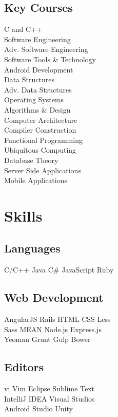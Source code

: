 \documentclass[]{deedy-resume-openfont}
\begin{document}
\begin{minipage}[t]{0.33\textwidth}
\subsection{Key Courses}
C and C++ \\
Software Engineering \\
Adv. Software Engineering \\
Software Tools \& Technology \\
Android Development \\
Data Structures \\
Adv. Data Structures \\
Operating Systems \\
Algorithms \& Design \\
Computer Architecture \\
Compiler Construction \\
Functional Programming \\
Ubiquitous Computing \\
Database Theory \\
Server Side Applications \\
Mobile Applications
\sectionsep


\section{Skills}
\subsection{Languages}
C/C++ \textbullet{} Java \textbullet{} C\# \textbullet{} JavaScript \textbullet{} Ruby \\ 
\subsection{Web Development}
AngularJS \textbullet{} Rails \textbullet{} HTML \textbullet{} CSS \textbullet{} Less \\
Sass \textbullet{} MEAN \textbullet{}  Node.js \textbullet{} Express.js \\
Yeoman \textbullet{} Grunt \textbullet{} Gulp \textbullet{} Bower \\
\subsection{Editors}
vi \textbullet{} Vim \textbullet{} Eclipse \textbullet{} Sublime Text \\
IntelliJ IDEA \textbullet{} Visual Studios \\
Android Studio \textbullet{} Unity

\end{minipage}
\end{document}
